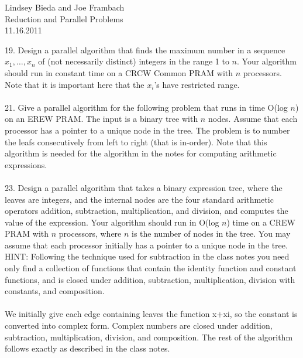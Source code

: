 \documentclass[10pt]{article}
\begin{document}
	\begin{flushright}
	Lindsey Bieda and Joe Frambach\\
	Reduction and Parallel Problems\\
	11.16.2011
	\end{flushright}

19. Design a parallel algorithm that finds the maximum number in a sequence $x_1, \ldots, x_n$ of (not necessarily
distinct) integers in the range 1 to $n$. Your algorithm should run in constant time on a CRCW
Common PRAM with $n$ processors. Note that it is important here that the $x_i$'s have restricted
range.
\\
\\
21. Give a parallel algorithm for the following problem that runs in time O(log $n$) on an EREW PRAM.
The input is a binary tree with $n$ nodes. Assume that each processor has a pointer to a unique node in
the tree. The problem is to number the leafs consecutively from left to right (that is in-order). Note
that this algorithm is needed for the algorithm in the notes for computing arithmetic expressions.
\\
\\
23. Design a parallel algorithm that takes a binary expression tree, where the leaves are integers, and the
internal nodes are the four standard arithmetic operators addition, subtraction, multiplication, and
division, and computes the value of the expression. Your algorithm should run in O(log $n$) time on a
CREW PRAM with $n$ processors, where $n$ is the number of nodes in the tree. You may assume that
each processor initially has a pointer to a unique node in the tree.\\
HINT: Following the technique used for subtraction in the class notes you need only find a collection
of functions that contain the identity function and constant functions, and is closed under addition,
subtraction, multiplication, division with constants, and composition.
\\
\\
We initially give each edge containing leaves the function x+xi, so the constant is converted into complex form.
Complex numbers are closed under addition, subtraction, multiplication, division, and composition. The rest of
the algorithm follows exactly as described in the class notes. \\
\end{document}
